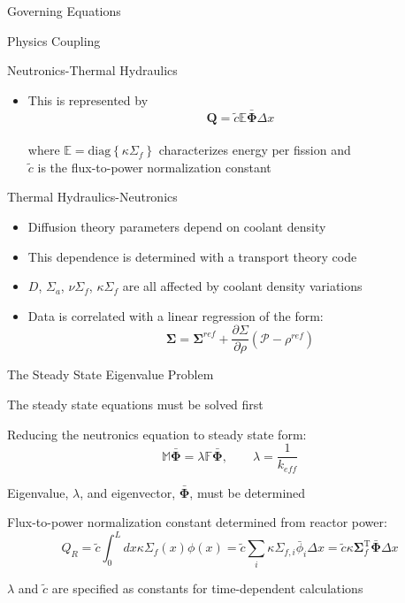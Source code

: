 \documentclass{beamer}
\begin{document}
\begin{section}{Governing Equations}
\begin{frame}{Physics Coupling}
\begin{block}{Neutronics-Thermal Hydraulics}
\begin{itemize}
    \item This is represented by
    \[
      \mathbf{Q}=\tilde{c}\mathbb{E}\bar{\mathbf{\Phi}}\Delta x
    \]
    \\where $\mathbb{E}=\mathrm{diag}\left\{\kappa\Sigma_{f}\right\}$ characterizes energy per fission and \\  $\tilde{c}$ is the flux-to-power normalization constant
  \end{itemize}
\end{block}
\begin{alertblock}{Thermal Hydraulics-Neutronics}
  \begin{itemize}
    \item Diffusion theory parameters depend on coolant density
    \item This dependence is determined with a transport theory code
    \item $D$, $\Sigma_{a}$, $\nu\Sigma_{f}$, $\kappa\Sigma_{f}$ are all affected by coolant density variations
    \item Data is correlated with a linear regression of the form:
    \[
     \mathbf{\Sigma} = \mathbf{\Sigma}^{ref} + \frac{\partial\Sigma}{\partial\rho}\left(\mathcal{P} - \rho^{ref}\right)
    \]
  \end{itemize}
\end{alertblock}
\end{frame}
\begin{frame}{The Steady State Eigenvalue Problem}
\begin{customlist}{2ex}{0pt}
  \item The steady state equations must be solved first
  \vfill\item Reducing the neutronics equation to steady state form:
  \[
    \mathbb{M}\bar{\mathbf{\Phi}}=\lambda\mathbb{F}\bar{\mathbf{\Phi}},\qquad \lambda = \frac{1}{k_{eff}}
  \]
  \vfill\item Eigenvalue, $\lambda$, and eigenvector, $\bar{\mathbf{\Phi}}$, must be determined
  \vfill\item Flux-to-power normalization constant determined from reactor power:
  \[
    Q_{R}=\tilde{c}\int_{0}^{L}dx\kappa\Sigma_{f}\left(x\right)\phi\left(x\right)=\tilde{c}\sum_{i}\kappa\Sigma_{f,i}\bar{\phi}_{i}\Delta x=\tilde{c}\kappa\mathbf{\Sigma}_{f}^{\mathrm{T}}\bar{\mathbf{\Phi}}\Delta x
  \]
  \item $\lambda$ and $\tilde{c}$ are specified as constants for time-dependent calculations 
  \vspace{0.5cm}
\end{customlist}
\end{frame}
\end{section}
\end{document}
